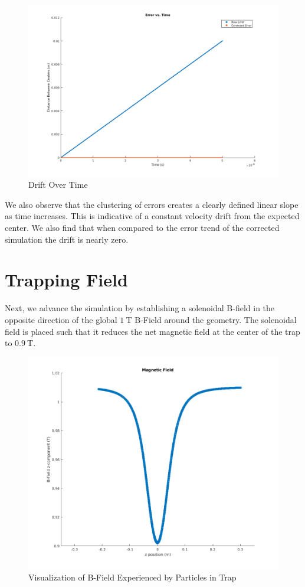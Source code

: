\documentclass[12pt,letterpaper]{article}
\begin{document}
    \begin{figure}[H]
    \centering
    \includegraphics[width=0.7\linewidth]{img/drift2.png}
    \caption{Drift Over Time}
    \end{figure}

We also observe that the clustering of errors creates a clearly defined linear slope as time increases. This is indicative of a constant velocity drift from the expected center. We also find that when compared to the error trend of the corrected simulation the drift is nearly zero. 

\section{Trapping Field}

Next, we advance the simulation by establishing a solenoidal B-field in the opposite direction of the global $1~$T B-Field around the geometry. The solenoidal field is placed such that it reduces the net magnetic field at the center of the trap to $0.9~$T. 

    \begin{figure}[H]
    \centering
    \includegraphics[width=0.7\linewidth]{img/solenoid.png}
    \caption{Visualization of B-Field Experienced by Particles in Trap}
    \end{figure}
\end{document}

